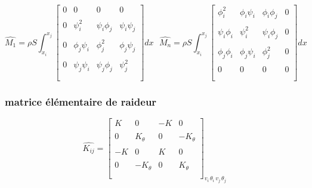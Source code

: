 \documentclass[a4paper,10pt]{report} %
\begin{document}
 
  \[ \widehat{M_1}=\rho S\int_{x_i}^{x_j}\left[ \begin{array}{cccc}
0 &0&0&0    \\\\
0 & \psi_i^2& \psi_i\phi_j&\psi_i\psi_j \\\\
0&\phi_j\psi_i& \phi_j^2&\phi_j\psi_j     \\\\
0 &\psi_j\psi_i&\psi_j \phi_j&\psi_j^2    \\\\
 \end{array} \right]dx
 \,\,\,\,
 \widehat{M_n}=\rho S\int_{x_i}^{x_j}\left[ \begin{array}{cccc}
\phi_i^2 &\phi_i\psi_i& \phi_i\phi_j&0     \\\\
\psi_i\phi_i & \psi_i^2& \psi_i\phi_j&0 \\\\
\phi_j\phi_i &\phi_j\psi_i& \phi_j^2&0     \\\\
0&0&0&0    \\\\
 \end{array} \right]dx\]
 
 \subsubsection{matrice élémentaire de raideur}
\[ \widehat{K_{ij}}=\left[ \begin{array}{cccc}
K &0& -K&0     \\\\
0 & K_{\theta}&0&-K_{\theta} \\\\
-K &0& K&0     \\\\
0&-K_{\theta}& 0&K_{\theta}   \\\\
 \end{array} \right]_{v_i \, \theta_i \, v_j \, \theta_j \, } \]
 
\end{document}
